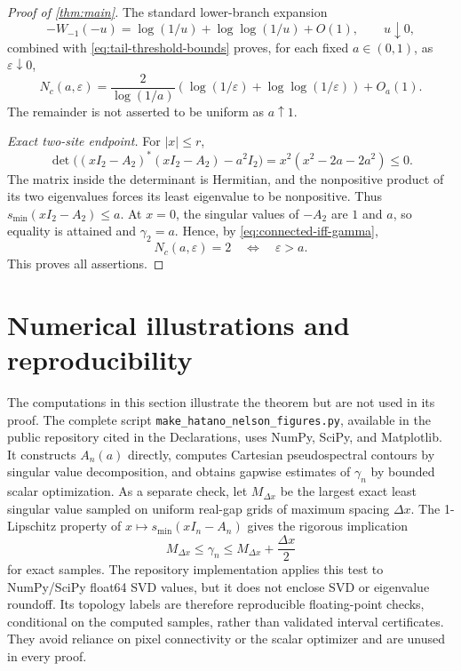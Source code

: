 \documentclass[review,hidelinks,onefignum,onetabnum]{siamart251216}
\begin{document}
\begin{proof}[Proof of \cref{thm:main}]
The standard lower-branch expansion \cite{CorlessEtAl1996}
\[
 -W_{-1}(-u)=\log(1/u)+\log\!\log(1/u)+O(1),
 \qquad u\downarrow0,
\]
combined with \eqref{eq:tail-threshold-bounds} proves, for each fixed
\(a\in(0,1)\), as \(\varepsilon\downarrow0\),
\begin{equation}\label{eq:N-asymptotic}
 \boxed{
 N_c(a,\varepsilon)=
 \frac{2}{\log(1/a)}
 \left(\log(1/\varepsilon)+
       \log\!\log(1/\varepsilon)\right)+O_a(1).}
\end{equation}
The remainder is not asserted to be uniform as \(a\uparrow1\).

\medskip\noindent\emph{Exact two-site endpoint.}\quad
For $|x|\leq r$,
\[
 \det\bigl((xI_2-A_2)^*(xI_2-A_2)-a^2I_2\bigr)
 =x^2(x^2-2a-2a^2)\leq0.
\]
The matrix inside the determinant is Hermitian, and the nonpositive
product of its two eigenvalues forces its least eigenvalue to be
nonpositive.  Thus $s_{\min}(xI_2-A_2)\leq a$.  At $x=0$, the singular
values of $-A_2$ are $1$ and $a$, so equality is attained and
$\gamma_2=a$.  Hence, by \eqref{eq:connected-iff-gamma},
\begin{equation}\label{eq:N-two}
 N_c(a,\varepsilon)=2\quad\Longleftrightarrow\quad\varepsilon>a.
\end{equation}
This proves all assertions.
\end{proof}

\section{Numerical illustrations and reproducibility}\label{sec:numerics}

The computations in this section illustrate the theorem but are not used in
its proof.  The complete script
\texttt{make\_hatano\_nelson\_figures.py}, available in the public repository
cited in the Declarations, uses NumPy, SciPy, and Matplotlib.  It constructs
\(A_n(a)\) directly, computes Cartesian pseudospectral contours by singular
value decomposition, and obtains gapwise estimates of \(\gamma_n\) by bounded
scalar optimization.  As a separate check, let \(M_{\Delta x}\) be the largest
exact least singular value sampled on uniform real-gap grids of maximum
spacing \(\Delta x\).  The 1-Lipschitz property of
\(x\mapsto s_{\min}(xI_n-A_n)\) gives the rigorous implication
\[
 M_{\Delta x}\leq\gamma_n\leq M_{\Delta x}+\frac{\Delta x}{2}
\]
for exact samples.  The repository implementation applies this test to
NumPy/SciPy float64 SVD values, but it does not enclose SVD or eigenvalue
roundoff.  Its topology labels are therefore reproducible floating-point
checks, conditional on the computed samples, rather than validated interval
certificates.  They avoid reliance on pixel connectivity or the scalar
optimizer and are unused in every proof.
\end{document}
